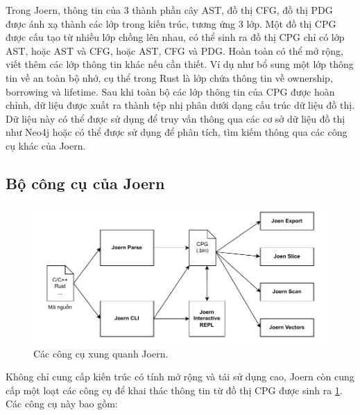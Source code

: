 Trong Joern, thông tin của 3 thành phần cây AST, đồ thị CFG, đồ thị PDG được ánh xạ thành các lớp trong kiến trúc, tương ứng 3 lớp.
Một đồ thị CPG được cấu tạo từ nhiều lớp chồng lên nhau, có thể sinh ra đồ thị CPG chỉ có lớp AST, hoặc AST và CFG, hoặc AST, CFG và PDG.
Hoàn toàn có thể mở rộng, viết thêm các lớp thông tin khác nếu cần thiết.
Ví dụ như bổ sung một lớp thông tin về an toàn bộ nhớ, cụ thể trong Rust là lớp chứa thông tin về ownership, borrowing và lifetime.
Sau khi toàn bộ các lớp thông tin của CPG được hoàn chỉnh, dữ liệu được xuất ra thành tệp nhị phân dưới dạng cấu trúc dữ liệu đồ thị.
Dữ liệu này có thể được sử dụng để truy vấn thông qua các cơ sở dữ liệu đồ thị như Neo4j \cite{miller2013graph} hoặc có thể được sử dụng để phân tích, tìm kiếm thông qua các công cụ khác của Joern.

\subsection{Bộ công cụ của Joern}

\begin{figure}[H]
  \includegraphics[width=1\columnwidth]{figures/c2/c2_joern_tools.drawio.pdf}
  \centering
  \caption{Các công cụ xung quanh Joern.}
  \label{img:c2_joern_tools}
\end{figure}

Không chỉ cung cấp kiến trúc có tính mở rộng và tái sử dụng cao, Joern còn cung cấp một loạt các công cụ để khai thác thông tin từ đồ thị CPG được sinh ra \ref{img:c2_joern_tools}.
Các công cụ này bao gồm:


